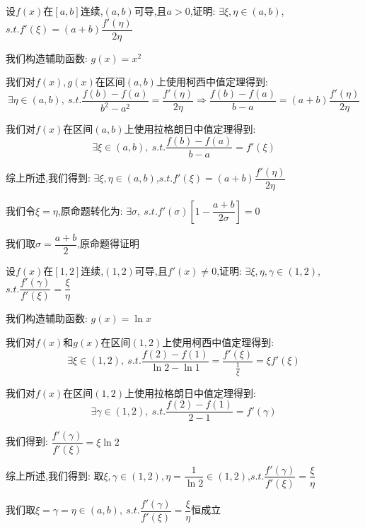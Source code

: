 \begin{proposition}
	设$f(x)$在$[a,b]$连续,$(a,b)$可导,且$a>0$,证明: $\exists \xi,\eta\in(a,b)$,$s.t. f'(\xi)=(a+b)\dfrac{f'(\eta)}{2\eta}$
\end{proposition}
\begin{solution}

	我们构造辅助函数: $g(x)=x^2$

	我们对$f(x),g(x)$在区间$(a,b)$上使用柯西中值定理得到:
	$$\exists\eta\in(a,b),\ s.t. \dfrac{f(b)-f(a)}{b^2-a^2}=\dfrac{f'(\eta)}{2\eta}\Rightarrow \dfrac{f(b)-f(a)}{b-a}=(a+b)\dfrac{f'(\eta)}{2\eta}$$

	我们对$f(x)$在区间$(a,b)$上使用拉格朗日中值定理得到:
	$$\exists\xi\in(a,b),\ s.t. \dfrac{f(b)-f(a)}{b-a}=f'(\xi)$$

	综上所述,我们得到: $\exists \xi,\eta\in(a,b)$,$s.t. f'(\xi)=(a+b)\dfrac{f'(\eta)}{2\eta}$
\end{solution}
\begin{anymark}[注]
	我们令$\xi=\eta$,原命题转化为: $\exists \sigma,\ s.t. f'(\sigma)[1-\dfrac{a+b}{2\sigma}]=0$

	我们取$\sigma=\dfrac{a+b}{2}$,原命题得证明
\end{anymark}

\begin{proposition}
	设$f(x)$在$[1,2]$连续,$(1,2)$可导,且$f'(x)\neq 0$,证明: $\exists \xi,\eta,\gamma\in(1,2)$,$s.t. \dfrac{f'(\gamma)}{f'(\xi)}=\dfrac{\xi}{\eta}$
\end{proposition}
\begin{solution}

	我们构造辅助函数: $g(x)=\ln x$

	我们对$f(x)$和$g(x)$在区间$(1,2)$上使用柯西中值定理得到:
	$$\exists\xi\in(1,2),\ s.t. \dfrac{f(2)-f(1)}{\ln 2-\ln 1}=\dfrac{f'(\xi)}{\frac{1}{\xi}}=\xi f'(\xi)$$

	我们对$f(x)$在区间$(1,2)$上使用拉格朗日中值定理得到:
	$$\exists\gamma\in(1,2),\ s.t. \dfrac{f(2)-f(1)}{2-1}=f'(\gamma)$$

	我们得到: $\dfrac{f'(\gamma)}{f'(\xi)}=\xi \ln 2$

	综上所述,我们得到: 取$\xi,\gamma\in(1,2),\eta=\dfrac{1}{\ln2}\in(1,2)$,$s.t. \dfrac{f'(\gamma)}{f'(\xi)}=\dfrac{\xi}{\eta}$
\end{solution}
\begin{anymark}[注]
	我们取$\xi=\gamma=\eta\in(a,b),\ s.t. \dfrac{f'(\gamma)}{f'(\xi)}=\dfrac{\xi}{\eta}$恒成立
\end{anymark}

